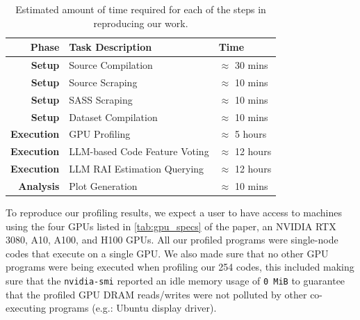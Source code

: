 \begin{table}[h]
\centering
\caption{Estimated amount of time required for each of the steps in reproducing our work.}
\label{tab:reproductionTime}
\begin{tabular}{rll}
\toprule
Phase &  Task Description &  Time\\
\midrule
\textbf{Setup}     & Source Compilation            & $\approx$ 30 mins \\
\textbf{Setup}     & Source Scraping               & $\approx$ 10 mins \\
\textbf{Setup}     & SASS Scraping                 & $\approx$ 10 mins \\
\textbf{Setup}     & Dataset Compilation           & $\approx$ 10 mins \\
\textbf{Execution} & GPU Profiling                 & $\approx$ 5 hours \\
\textbf{Execution} & LLM-based Code Feature Voting & $\approx$ 12 hours \\
\textbf{Execution} & LLM RAI Estimation Querying   & $\approx$ 12 hours \\
\textbf{Analysis}  & Plot Generation               & $\approx$ 10 mins\\
\bottomrule
\end{tabular}
\end{table}

% 






\artin
{}
To reproduce our profiling results, we expect a user to have access to machines using the four GPUs listed in \autoref{tab:gpu_specs} of the paper, an NVIDIA RTX 3080, A10, A100, and H100 GPUs.
All our profiled programs were single-node codes that execute on a single GPU. 
We also made sure that no other GPU programs were being executed when profiling our 254 codes, this included making sure that the \texttt{nvidia-smi} reported an idle memory usage of \texttt{0 MiB} to guarantee that the profiled GPU DRAM reads/writes were not polluted by other co-executing programs (e.g.: Ubuntu display driver).












